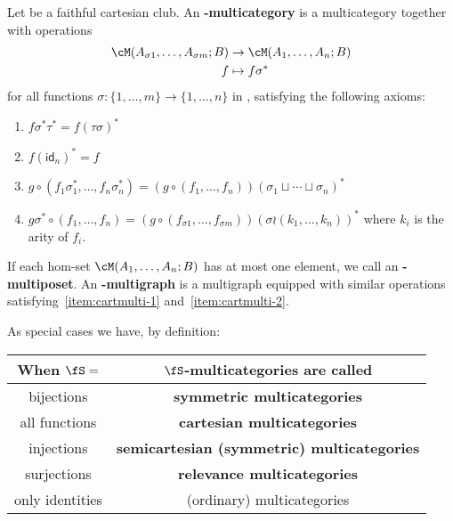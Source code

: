 \documentclass{book}
\def\idfunc{\mathsf{id}}
\begin{document}
\begin{defn}\label{defn:fS-multicategory}
  Let \fS be a faithful cartesian club.
  An \textbf{\fS-multicategory} is a multicategory \cM together with operations
  \begin{align*}
    \cM(A_{\sigma 1},\dots,A_{\sigma m}; B) &\to \cM(A_1,\dots,A_n;B)\\
    f &\mapsto f\sigma^*
  \end{align*}
  for all functions $\sigma : \{1,\dots,m\} \to \{1,\dots,n\}$ in \fS, satisfying the following axioms:
  \begin{enumerate}
  \item $f \sigma^* \tau^* = f(\tau\sigma)^*$\label{item:cartmulti-1}
  \item $f (\idfunc_n)^* = f$\label{item:cartmulti-2}
  \item $g\circ (f_1 \sigma_1^* ,\dots, f_n \sigma_n^*) = (g \circ (f_1,\dots,f_n))(\sigma_1\sqcup \cdots \sqcup \sigma_n)^*$\label{item:cartmulti-3}
  \item $g\sigma^* \circ (f_1,\dots,f_n) = (g\circ (f_{\sigma 1},\dots, f_{\sigma m}))(\sigma \wr (k_1,\dots,k_n))^*$ where $k_i$ is the arity of $f_i$.\label{item:cartmulti-4}
  \end{enumerate}
  If each hom-set $\cM(A_1,\dots,A_n;B)$ has at most one element, we call \cM an \textbf{\fS-multiposet}.
  An \textbf{\fS-multigraph} is a multigraph equipped with similar operations satisfying~\ref{item:cartmulti-1} and~\ref{item:cartmulti-2}.
\end{defn}

As special cases we have, by definition:
\begin{center}
\begin{tabular}{c|c}
  When $\fS=$ & $\fS$-multicategories are called\\\hline
  bijections & \textbf{symmetric multicategories}\\
  all functions & \textbf{cartesian multicategories}\\
  injections & \textbf{semicartesian (symmetric) multicategories}\\
  surjections & \textbf{relevance multicategories}\\
  only identities & (ordinary) multicategories
\end{tabular}
\end{center}

\end{document}
